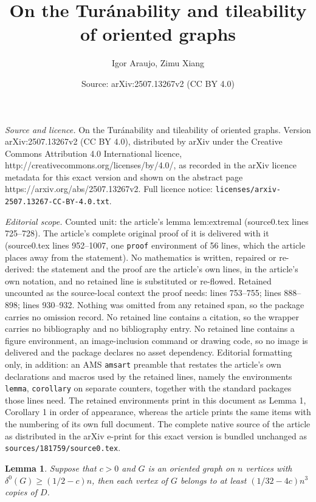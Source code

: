 \documentclass[10pt,a4paper]{amsart}
\title{On the Tur\'anability and tileability of oriented graphs}
\author{Igor Araujo, Zimu Xiang}
\date{Source: arXiv:2507.13267v2 (CC BY 4.0)}
\newtheorem{lemma}{Lemma}
\begin{document}
\maketitle

\noindent\emph{Source and licence.} On the Tur\'anability and tileability of oriented graphs. Version arXiv:2507.13267v2 (CC BY 4.0), distributed by arXiv under the Creative Commons Attribution 4.0 International licence, http://creativecommons.org/licenses/by/4.0/, as recorded in the arXiv licence metadata for this exact version and shown on the abstract page https://arxiv.org/abs/2507.13267v2. Full licence notice: \texttt{licenses/arxiv-2507.13267-CC-BY-4.0.txt}.\par\smallskip

\noindent\textit{Editorial scope.} Counted unit: the article's lemma lem:extremal (source0.tex lines 725--728). The article's complete original proof of it is delivered with it (source0.tex lines 952--1007, one \texttt{proof} environment of 56 lines, which the article places away from the statement). No mathematics is written, repaired or re-derived: the statement and the proof are the article's own lines, in the article's own notation, and no retained line is substituted or re-flowed.  Retained uncounted as the source-local context the proof needs: lines 753--755; lines 888--898; lines 930--932.  Nothing was omitted from any retained span, so the package carries no omission record.  No retained line contains a citation, so the wrapper carries no bibliography and no bibliography entry.  No retained line contains a figure environment, an image-inclusion command or drawing code, so no image is delivered and the package declares no asset dependency.  Editorial formatting only, in addition: an AMS \texttt{amsart} preamble that restates the article's own declarations and macros used by the retained lines, namely the environments \texttt{lemma}, \texttt{corollary} on separate counters, together with the standard packages those lines need.  The retained environments print in this document as Lemma 1, Corollary 1 in order of appearance, whereas the article prints the same items with the numbering of its own full document.  The complete native source of the article as distributed in the arXiv e-print for this exact version is bundled unchanged as \texttt{sources/181759/source0.tex}.
\begin{lemma}\label{lem:minimum_degree}
    Suppose that $c>0$ and $G$ is an oriented graph on $n$ vertices with $\delta^0(G)\ge (1/2-c)n$, then each vertex of $G$ belongs to at least $(1/32-4c)n^3$ copies of $D$.
\end{lemma}
\end{document}

